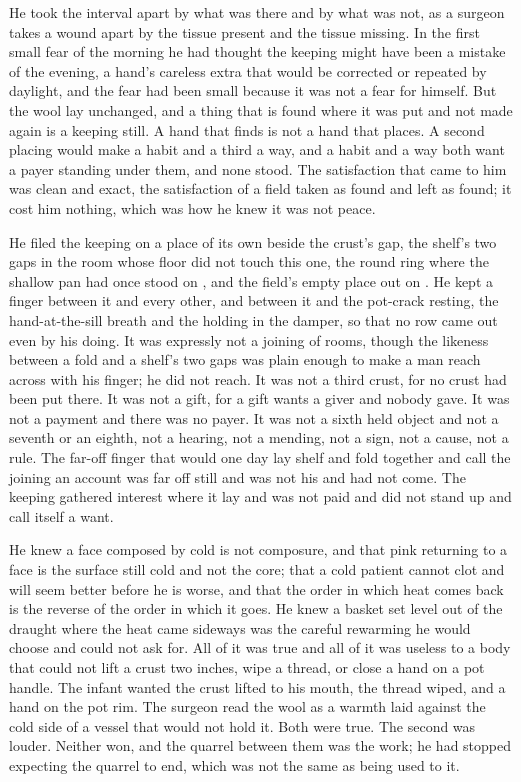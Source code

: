 He took the interval apart by what was there and by what was not, as a surgeon takes a wound apart by the tissue present and the tissue missing. In the first small fear of the morning he had thought the keeping might have been a mistake of the evening, a hand's careless extra that would be corrected or repeated by daylight, and the fear had been small because it was not a fear for himself. But the wool lay unchanged, and a thing that is found where it was put and not made again is a keeping still. A hand that finds is not a hand that places. A second placing would make a habit and a third a way, and a habit and a way both want a payer standing under them, and none stood. The satisfaction that came to him was clean and exact, the satisfaction of a field taken as found and left as found; it cost him nothing, which was how he knew it was not peace.

He filed the keeping on a place of its own beside the crust's gap, the shelf's two gaps in the room whose floor did not touch this one, the round ring where the shallow pan had once stood on , and the field's empty place out on . He kept a finger between it and every other, and between it and the pot-crack resting, the hand-at-the-sill breath and the holding in the damper, so that no row came out even by his doing. It was expressly not a joining of rooms, though the likeness between a fold and a shelf's two gaps was plain enough to make a man reach across with his finger; he did not reach. It was not a third crust, for no crust had been put there. It was not a gift, for a gift wants a giver and nobody gave. It was not a payment and there was no payer. It was not a sixth held object and not a seventh or an eighth, not a hearing, not a mending, not a sign, not a cause, not a rule. The far-off finger that would one day lay shelf and fold together and call the joining an account was far off still and was not his and had not come. The keeping gathered interest where it lay and was not paid and did not stand up and call itself a want.

He knew a face composed by cold is not composure, and that pink returning to a face is the surface still cold and not the core; that a cold patient cannot clot and will seem better before he is worse, and that the order in which heat comes back is the reverse of the order in which it goes. He knew a basket set level out of the draught where the heat came sideways was the careful rewarming he would choose and could not ask for. All of it was true and all of it was useless to a body that could not lift a crust two inches, wipe a thread, or close a hand on a pot handle. The infant wanted the crust lifted to his mouth, the thread wiped, and a hand on the pot rim. The surgeon read the wool as a warmth laid against the cold side of a vessel that would not hold it. Both were true. The second was louder. Neither won, and the quarrel between them was the work; he had stopped expecting the quarrel to end, which was not the same as being used to it.

